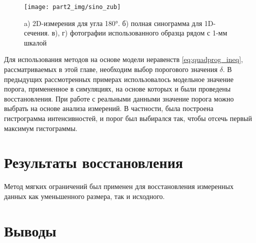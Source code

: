 \begin{figure}
    \centering
    \texttt{[image: part2\_img/sino\_zub]} \\
    \caption{a) 2D-измерения для угла \ang{180}. б) полная синограмма для 1D-сечения. в), г) фотографии использованного образца рядом с 1-мм шкалой}
    \label{fig:sino_zub}
\end{figure}

Для использования методов на основе модели неравенств \ref{eq:quadprog_ineq}, рассматриваемых в этой главе, необходим выбор порогового значения $\delta$.
В предыдущих рассмотренных примерах использовалось модельное значение порога, примененное в симуляциях, на основе которых и были проведены восстановления.
При работе с реальными данными значение порога можно выбрать на основе анализа измерений.
В частности, была построена гистрограмма интенсивностей, и порог был выбирался так, чтобы отсечь первый максимум гистограммы.


\section{Результаты восстановления}
Метод мягких ограничений был применен для восстановления измеренных данных как уменьшенного размера, так и исходного.

\section{Выводы}
